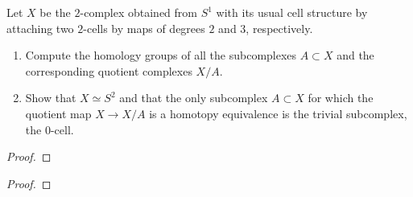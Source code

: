 \begin{problem}[Hatcher {\S}2.2, Ex.\@ 13]
Let $X$ be the $2$-complex obtained from $S^1$ with its usual cell
structure by attaching two $2$-cells by maps of degrees $2$ and $3$,
respectively.
\begin{enumerate}[label=(\alph*)]
\item Compute the homology groups of all the subcomplexes $A\subset X$ and
  the corresponding quotient complexes $X/A$.
\item Show that $X\simeq S^2$ and that the only subcomplex $A\subset X$ for
  which the quotient map $X\to X/A$ is a homotopy equivalence is the
  trivial subcomplex, the $0$-cell.
\end{enumerate}
\end{problem}
\begin{proof}
\end{proof}
\newpage

\begin{problem}
\end{problem}
\begin{proof}
\end{proof}


